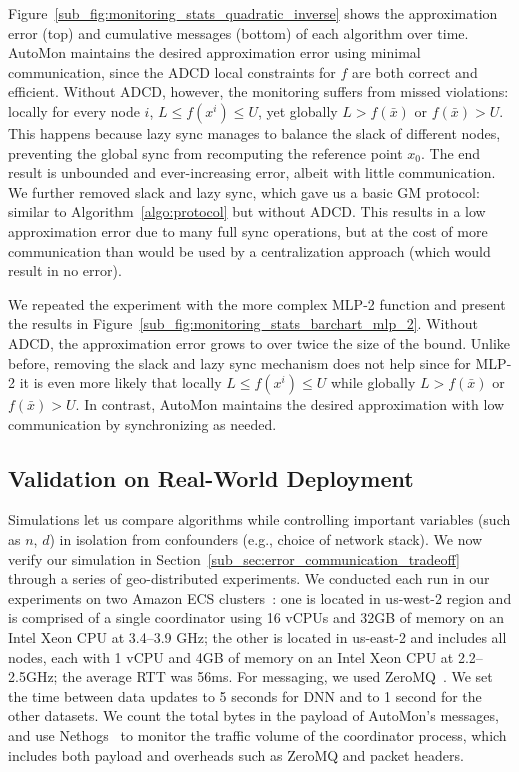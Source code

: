 Figure~\ref{sub_fig:monitoring_stats_quadratic_inverse} shows the approximation error (top) and cumulative messages (bottom) of each algorithm over time. 
AutoMon maintains the desired approximation error using minimal communication, since the ADCD local constraints for $f$ are both correct and efficient.
Without ADCD, however, the monitoring suffers from missed violations: locally for every node $i$, $L \leq f(x^i) \leq U$, yet globally $L > f(\bar{x})$ or $f(\bar{x}) > U$.
This happens because lazy sync manages to balance the slack of different nodes, preventing the global sync from recomputing the reference point $x_0$.
The end result is unbounded and ever-increasing error, albeit with little communication.
We further removed slack and lazy sync, which gave us a basic GM protocol: similar to Algorithm~\ref{algo:protocol} but without ADCD.
This results in a low approximation error due to many full sync operations, but at the cost of more communication than would be used by a centralization approach (which would result in no error).

We repeated the experiment with the more complex MLP-2 function and present the results in Figure~\ref{sub_fig:monitoring_stats_barchart_mlp_2}.
Without ADCD, the approximation error grows to over twice the size of the bound.
Unlike before, removing the slack and lazy sync mechanism does not help since for MLP-2 it is even more likely that locally $L \leq f(x^i) \leq U$ while globally $L > f(\bar{x})$ or $f(\bar{x}) > U$.
In contrast, AutoMon maintains the desired approximation with low communication by synchronizing as needed.





\subsection{Validation on Real-World Deployment}
\label{sec:distributed-experiment}

Simulations let us compare algorithms while controlling important variables (such as $n$, $d$) in isolation from confounders (e.g., choice of network stack).
%
We now verify our simulation in Section~\ref{sub_sec:error_communication_tradeoff} through a series of geo-distributed experiments.
We conducted each run in our experiments on two Amazon ECS clusters~\cite{amazonecs}: one is located in us-west-2 region and is comprised of a single coordinator using 16 vCPUs and 32GB of memory on an Intel Xeon CPU at 3.4--3.9 GHz;
the other is located in us-east-2 and includes all nodes, each with 1 vCPU and 4GB of memory on an Intel Xeon CPU at 2.2--2.5GHz;
the average RTT was 56ms.
For messaging, we used ZeroMQ~\cite{zeromq}.
We set the time between data updates to 5 seconds for DNN and to 1 second for the other datasets.
We count the total bytes in the payload of AutoMon's messages, and use Nethogs~\cite{nethogs} to monitor the traffic volume of the coordinator process, which includes both payload and overheads such as ZeroMQ and packet headers.

